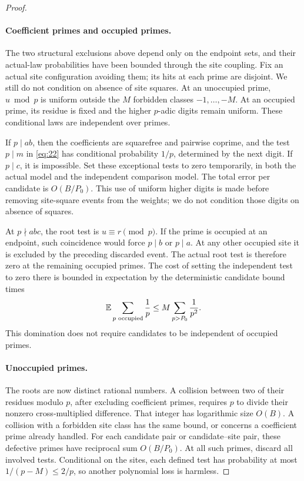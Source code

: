 \begin{proof}
\paragraph{Coefficient primes and occupied primes.}
The two structural exclusions above depend only on the endpoint sets,
and their actual-law probabilities have been bounded through the site
coupling. Fix an actual site configuration avoiding them; its hits at
each prime are disjoint. We still do not condition on absence of site
squares. At an unoccupied prime, $u\bmod p$ is uniform
outside the $M$ forbidden classes $-1,\ldots,-M$.
At an occupied prime, its residue is fixed and the higher
$p$-adic digits remain uniform. These conditional laws are
independent over primes.

If $p\mid ab$, then the coefficients are squarefree and
pairwise coprime, and the test $p\mid m$ in \eqref{eq:22}
has conditional probability $1/p$, determined by the next
digit. If $p\mid c$, it is impossible. Set these exceptional
tests to zero temporarily, in both the actual model and the
independent comparison model. The total error per candidate
is $O(B/P_0)$. This use of uniform higher digits is made
before removing site-square events from the weights; we
do not condition those digits on absence of squares.

At $p\nmid abc$, the root test is $u\equiv r\pmod p$.
If the prime is occupied at an endpoint, such coincidence
would force $p\mid b$ or $p\mid a$. At any other occupied
site it is excluded by the preceding discarded event.
The actual root test is therefore zero at the remaining
occupied primes. The cost of setting the independent test
to zero there is bounded in expectation by the deterministic
candidate bound times
\[
 \mathbb E\sum_{p\text{ occupied}}\frac1p
 \le M\sum_{p>P_0}\frac1{p^2}.
\]
This domination does not require candidates to be independent
of occupied primes.

\paragraph{Unoccupied primes.}
The roots are now distinct rational numbers. A collision
between two of their residues modulo $p$, after excluding
coefficient primes, requires $p$ to divide their nonzero
cross-multiplied difference. That integer has logarithmic
size $O(B)$. A collision with a forbidden site class has
the same bound, or concerns a coefficient prime already
handled. For each candidate pair or candidate--site pair,
these defective primes have reciprocal sum $O(B/P_0)$.
At all such primes, discard all involved tests. Conditional
on the sites, each defined test has probability at most
$1/(p-M)\le2/p$, so another polynomial loss is harmless.


\end{proof}
